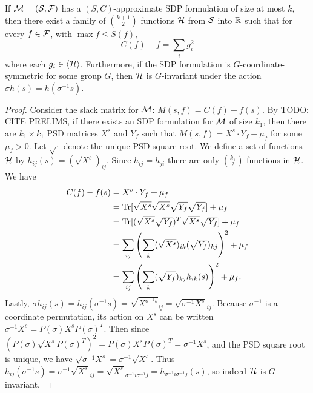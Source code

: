 \begin{lemma}\label{lem:sdptosos}
If $\mathcal M = (\mathcal S, \mathcal F)$ has a $(S,C)$-approximate SDP formulation of size at most $k$, then there exist a family of $\binom{k+1}{2}$ functions $\mathcal H$ from $\mathcal S$ into $\mathbb R$ such that for every $f \in \mathcal F$, with $\max f \leq S(f)$,
\[C(f) - f = \sum_i g_i^2\]
where each $g_i \in \langle \mathcal H \rangle$. Furthermore, if the SDP formulation is $G$-coordinate-symmetric for some group $G$, then $\mathcal H$ is $G$-invariant under the action $\sigma h(s) = h(\sigma^{-1}s)$.
\end{lemma} 
\begin{proof}
Consider the slack matrix for $\mathcal M$: $M(s,f) = C(f) - f(s)$. By TODO: CITE PRELIMS, if there exists an SDP formulation for $\mathcal M$ of size $k_1$, then there are $k_1 \times k_1$ PSD matrices $X^s$ and $Y_f$ such that $M(s,f) = X^s \cdot Y_f + \mu_f$ for some $\mu_f > 0$. Let $\sqrt{\cdot}$ denote the unique PSD square root. We define a set of functions $\mathcal H$ by $h_{ij}(s) = (\sqrt{X^s})_{ij}$. Since $h_{ij} = h_{ji}$ there are only $\binom{k_1}{2}$ functions in $\mathcal H$. We have
\begin{align*}
C(f) - f(s) &= X^s \cdot Y_f + \mu_f \\
&= \operatorname{Tr}[\sqrt{X^s}\sqrt{X^s}\sqrt{Y_f}\sqrt{Y_f}] + \mu_f \\
&= \operatorname{Tr}[(\sqrt{X^s}\sqrt{Y_f})^T\sqrt{X^s}\sqrt{Y_f}] + \mu_f \\
&= \sum_{ij} \left(\sum_k (\sqrt{X^s})_{ik}(\sqrt{Y_f})_{kj}\right)^2 + \mu_f \\
&= \sum_{ij} \left(\sum_k (\sqrt{Y_f})_{kj}h_{ik}(s)\right)^2 + \mu_f.
\end{align*}
Lastly, $\sigma h_{ij}(s) = h_{ij}(\sigma^{-1}s) = \sqrt{X^{\sigma^{-1}s}}_{ij} = \sqrt{\sigma^{-1}X^s}_{ij}$. Because $\sigma^{-1}$ is a coordinate permutation, its action on $X^s$ can be written $\sigma^{-1} X^s = P(\sigma) X^s P(\sigma)^T$. Then since $\left(P(\sigma)\sqrt{X^s}P(\sigma)^T\right)^2 = P(\sigma)X^sP(\sigma)^T = \sigma^{-1}X^s$, and the PSD square root is unique, we have $\sqrt{\sigma^{-1}X^s} = \sigma^{-1}\sqrt{X^s}$. Thus $h_{ij}(\sigma^{-1}s) = \sigma^{-1}\sqrt{X^s}_{ij} = \sqrt{X^s}_{\sigma^{-1}i\sigma^{-1}j} = h_{\sigma^{-1}i\sigma^{-1}j}(s)$, so indeed $\mathcal H$ is $G$-invariant. 
\end{proof}


